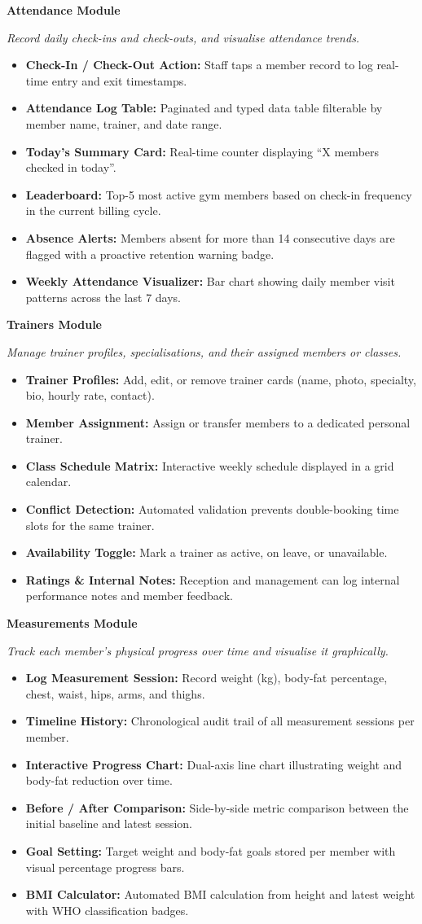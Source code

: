 \documentclass[11pt,a4paper]{article}
\newcommand{\modulebox}[4]{%
\begin{tcolorbox}[
    enhanced,
    breakable,
    colback=primaryblue!2,
    colframe=primaryblue,
    arc=0.8mm,
    boxrule=0pt,
    leftrule=3.5pt,
    left=10pt, right=10pt, top=10pt, bottom=10pt
]
{\large\bfseries\color{primaryblue}\faIcon{#1}\; #2}\par
\vspace{4pt}
\small\textit{#3}
\vspace{6pt}
\begin{itemize}[leftmargin=*, itemsep=3pt, topsep=3pt]
#4
\end{itemize}
\end{tcolorbox}
\vspace{8pt}
}
\begin{document}
\modulebox{clipboard-list}{Attendance Module}%
{Record daily check-ins and check-outs, and visualise attendance trends.}{
  \item \textbf{Check-In / Check-Out Action:} Staff taps a member record to log real-time entry and exit timestamps.
  \item \textbf{Attendance Log Table:} Paginated and typed data table filterable by member name, trainer, and date range.
  \item \textbf{Today's Summary Card:} Real-time counter displaying ``X members checked in today''.
  \item \textbf{Leaderboard:} Top-5 most active gym members based on check-in frequency in the current billing cycle.
  \item \textbf{Absence Alerts:} Members absent for more than 14 consecutive days are flagged with a proactive retention warning badge.
  \item \textbf{Weekly Attendance Visualizer:} Bar chart showing daily member visit patterns across the last 7 days.
}

\modulebox{users}{Trainers Module}%
{Manage trainer profiles, specialisations, and their assigned members or classes.}{
  \item \textbf{Trainer Profiles:} Add, edit, or remove trainer cards (name, photo, specialty, bio, hourly rate, contact).
  \item \textbf{Member Assignment:} Assign or transfer members to a dedicated personal trainer.
  \item \textbf{Class Schedule Matrix:} Interactive weekly schedule displayed in a grid calendar.
  \item \textbf{Conflict Detection:} Automated validation prevents double-booking time slots for the same trainer.
  \item \textbf{Availability Toggle:} Mark a trainer as active, on leave, or unavailable.
  \item \textbf{Ratings \& Internal Notes:} Reception and management can log internal performance notes and member feedback.
}

\modulebox{weight}{Measurements Module}%
{Track each member's physical progress over time and visualise it graphically.}{
  \item \textbf{Log Measurement Session:} Record weight (kg), body-fat percentage, chest, waist, hips, arms, and thighs.
  \item \textbf{Timeline History:} Chronological audit trail of all measurement sessions per member.
  \item \textbf{Interactive Progress Chart:} Dual-axis line chart illustrating weight and body-fat reduction over time.
  \item \textbf{Before / After Comparison:} Side-by-side metric comparison between the initial baseline and latest session.
  \item \textbf{Goal Setting:} Target weight and body-fat goals stored per member with visual percentage progress bars.
  \item \textbf{BMI Calculator:} Automated BMI calculation from height and latest weight with WHO classification badges.
}
\newpage
\end{document}
